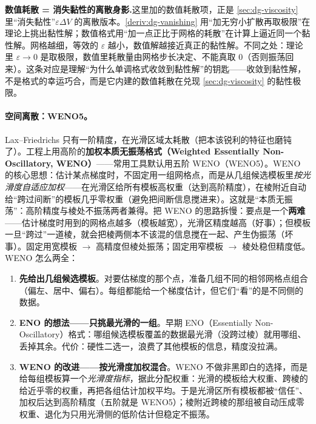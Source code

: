 \begin{insight}
\textbf{数值耗散 = 消失黏性的离散身影.}\;这里加的数值耗散项，正是 \cref{sec:dg-viscosity} 里“消失黏性”$\varepsilon\Delta V$ 的离散版本。\cref{deriv:dg-vanishing} 用“加无穷小扩散再取极限”在理论上挑出黏性解；数值格式用“加一点正比于网格的耗散”在计算上逼近同一个黏性解。网格越细，等效的 $\varepsilon$ 越小，数值解越接近真正的黏性解。不同之处：理论里 $\varepsilon\to0$ 是取极限，数值里耗散量由网格步长决定、不能真取 0（否则振荡回来）。这条对应是理解“为什么单调格式收敛到黏性解”的钥匙——收敛到黏性解，不是格式的幸运巧合，而是它内建的数值耗散在兑现 \cref{sec:dg-viscosity} 的黏性极限。
\end{insight}

\paragraph{空间离散：WENO5。}
Lax--Friedrichs 只有一阶精度，在光滑区域太耗散（把本该锐利的特征也磨钝了）。工程上用高阶的\textbf{加权本质无振荡格式（Weighted Essentially Non-Oscillatory, WENO）}——常用工具默认用五阶 WENO（WENO5）。WENO 的核心思想：估计某点梯度时，不固定用一组网格点，而是从几组候选模板里\emph{按光滑度自适应加权}——在光滑区给所有模板高权重（达到高阶精度），在棱附近自动给“跨过间断”的模板几乎零权重（避免把间断信息搅进来）。这就是“本质无振荡”：高阶精度与棱处不振荡两者兼得。把 WENO 的思路拆慢：要点是一个\textbf{两难}——估计梯度时用到的网格点越多（模板越宽），光滑区精度越高（好事）；但模板一旦“跨过”一道棱，就会把棱两侧本不该混的信息搅在一起、产生伪振荡（坏事）。固定用宽模板 $\to$ 高精度但棱处振荡；固定用窄模板 $\to$ 棱处稳但精度低。WENO 怎么两全：

\begin{enumerate}
  \item \textbf{先给出几组候选模板}。对要估梯度的那个点，准备几组不同的相邻网格点组合（偏左、居中、偏右）。每组都能给一个梯度估计，但它们“看”的是不同侧的数据。
  \item \textbf{ENO 的想法——只挑最光滑的一组}。早期 ENO（Essentially Non-Oscillatory）格式：哪组候选模板覆盖的数据最光滑（没跨过棱）就用哪组、丢掉其余。代价：硬性二选一，浪费了其他模板的信息，精度没拉满。
  \item \textbf{WENO 的改进——按光滑度加权混合}。WENO 不做非黑即白的选择，而是给每组模板算一个\emph{光滑度指标}，据此分配权重：光滑的模板给大权重、跨棱的给近乎零的权重，再把各组估计加权平均。于是光滑区所有模板都被“信任”、加权后达到高阶精度（五阶就是 WENO5）；棱附近跨棱的那组被自动压成零权重、退化为只用光滑侧的低阶估计但稳定不振荡。
\end{enumerate}

